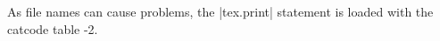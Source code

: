 As file names can cause problems, the |tex.print| statement is loaded with the catcode table -2. 
%
%
%
%
%
%
%


